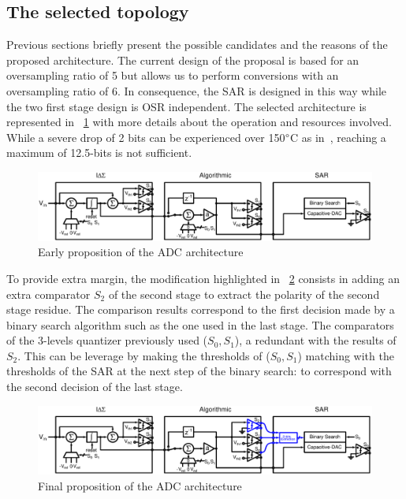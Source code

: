 \subsection{The selected topology}
\label{sec:selected-topology}
Previous sections briefly present the possible candidates and the reasons of the proposed architecture. The current design of the proposal is based for an oversampling ratio of 5 but allows us to perform conversions with an oversampling ratio of 6. In consequence, the SAR is designed in this way while the two first stage design is OSR independent. The selected architecture is represented in \figurename~\ref{fig:early-prop-adc-architecture} with more details about the operation and resources involved. While a severe drop of 2 bits can be experienced over 150\(\degree \)C as in~\cite{Ericson2004}, reaching a maximum of 12.5-bits is not sufficient.

\begin{figure}[htp]
	\centering
	\includegraphics[width=\textwidth]{Chapter4/Figs/architecture-full-principle.ps}
	\caption{Early proposition of the ADC architecture}
	\label{fig:early-prop-adc-architecture}
\end{figure}

To provide extra margin, the modification highlighted in \figurename~\ref{fig:final-prop-adc-architecture} consists in adding an extra comparator \(S_2\) of the second stage to extract the polarity of the second stage residue. The comparison results correspond to the first decision made by a binary search algorithm such as the one used in the last stage. The comparators of the 3-levels quantizer previously used (\(S_0, S_1 \)), a redundant with the results of \(S_2\). This can be leverage by making the thresholds of (\(S_0, S_1 \)) matching with the thresholds of the SAR at the next step of the binary search: to correspond with the second decision of the last stage.

\begin{figure}[htp]
	\centering
	\includegraphics[width=\textwidth]{Chapter4/Figs/architecture-full-principle-final.ps}
	\caption{Final proposition of the ADC architecture}
	\label{fig:final-prop-adc-architecture}
\end{figure}

